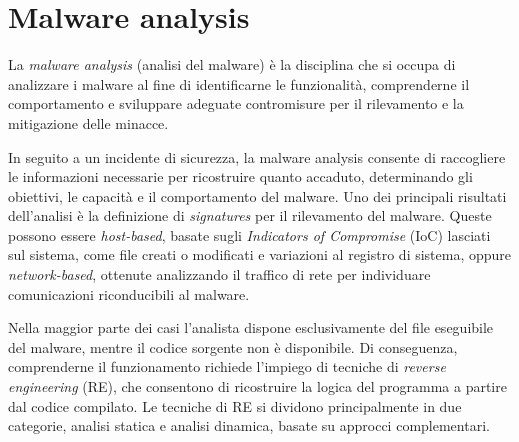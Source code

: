 
\section{Malware analysis} %

La \textit{malware analysis} (analisi del malware) è la disciplina che si occupa di analizzare i malware al fine di identificarne le funzionalità, comprenderne il comportamento e sviluppare adeguate contromisure per il rilevamento e la mitigazione delle minacce. \cite{sikorski2012practical}

In seguito a un incidente di sicurezza, la malware analysis consente di raccogliere le informazioni necessarie per ricostruire quanto accaduto, determinando gli obiettivi, le capacità e il comportamento del malware. Uno dei principali risultati dell'analisi è la definizione di \textit{signatures} per il rilevamento del malware. Queste possono essere \textit{host-based}, basate sugli \textit{Indicators of Compromise} (IoC) lasciati sul sistema, come file creati o modificati e variazioni al registro di sistema, oppure \textit{network-based}, ottenute analizzando il traffico di rete per individuare comunicazioni riconducibili al malware.

Nella maggior parte dei casi l'analista dispone esclusivamente del file eseguibile del malware, mentre il codice sorgente non è disponibile. Di conseguenza, comprenderne il funzionamento richiede l'impiego di tecniche di \textit{reverse engineering} (RE), che consentono di ricostruire la logica del programma a partire dal codice compilato. Le tecniche di RE si dividono principalmente in due categorie, analisi statica e analisi dinamica, basate su approcci complementari.

